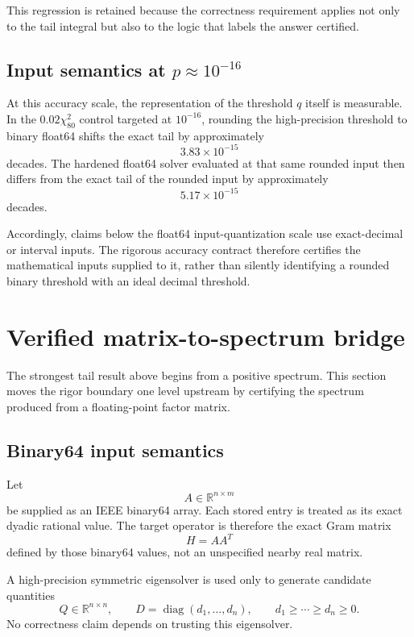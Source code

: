 \documentclass[11pt]{article}
\theoremstyle{definition}
\theoremstyle{remark}
\begin{document}
This regression is retained because the correctness requirement applies not
only to the tail integral but also to the logic that labels the answer
certified.

\subsection{Input semantics at \texorpdfstring{\(p\approx10^{-16}\)}{p about 1e-16}}

At this accuracy scale, the representation of the threshold \(q\) itself is
measurable.  In the \(0.02\chi^2_{80}\) control targeted at \(10^{-16}\),
rounding the high-precision threshold to binary float64 shifts the exact tail
by approximately
\[
3.83\times10^{-15}
\]
decades.  The hardened float64 solver evaluated at that same rounded input
then differs from the exact tail of the rounded input by approximately
\[
5.17\times10^{-15}
\]
decades.

Accordingly, claims below the float64 input-quantization scale use exact-decimal
or interval inputs.  The rigorous accuracy contract therefore certifies the
mathematical inputs supplied to it, rather than silently identifying a rounded
binary threshold with an ideal decimal threshold.


\section{Verified matrix-to-spectrum bridge}\label{sec:final-6}

The strongest tail result above begins from a positive spectrum.  This section
moves the rigor boundary one level upstream by certifying the spectrum produced
from a floating-point factor matrix.

\subsection{Binary64 input semantics}

Let
\[
A\in\mathbb R^{n\times m}
\]
be supplied as an IEEE binary64 array.  Each stored entry is treated as its
exact dyadic rational value.  The target operator is therefore the exact Gram
matrix
\[
H=AA^T
\]
defined by those binary64 values, not an unspecified nearby real matrix.

A high-precision symmetric eigensolver is used only to generate candidate
quantities
\[
Q\in\mathbb R^{n\times n},
\qquad
D=\operatorname{diag}(d_1,\ldots,d_n),
\qquad
d_1\ge\cdots\ge d_n\ge0.
\]
No correctness claim depends on trusting this eigensolver.
\end{document}
